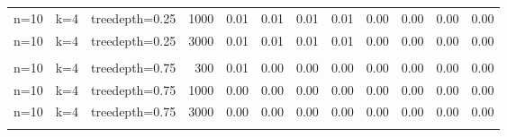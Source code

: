 \begin{table}[ht]
\begin{tabular}{rrrr|cccc|cccc}
  n=10 & k=4 & treedepth=0.25 & 1000 & 0.01 & 0.01 & 0.01 & 0.01 & 0.00 & 0.00 & 0.00 & 0.00 \\ 
  n=10 & k=4 & treedepth=0.25 & 3000 & 0.01 & 0.01 & 0.01 & 0.01 & 0.00 & 0.00 & 0.00 & 0.00 \\ 
   \\ 
n=10 & k=4 & treedepth=0.75 & 300 & 0.01 & 0.00 & 0.00 & 0.00 & 0.00 & 0.00 & 0.00 & 0.00 \\ 
  n=10 & k=4 & treedepth=0.75 & 1000 & 0.00 & 0.00 & 0.00 & 0.00 & 0.00 & 0.00 & 0.00 & 0.00 \\ 
  n=10 & k=4 & treedepth=0.75 & 3000 & 0.00 & 0.00 & 0.00 & 0.00 & 0.00 & 0.00 & 0.00 & 0.00 \\ 
   \bottomrule 
 \multicolumn{12}{l}{\scriptsize } 
 \end{tabular}
\end{table}
